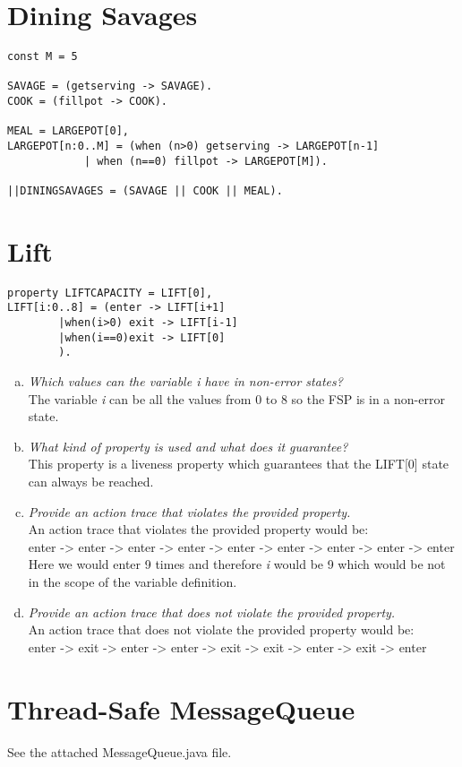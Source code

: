 \documentclass{report}
\begin{document}
	\section{Dining Savages}
	\startsection
		\begin{verbatim}
const M = 5

SAVAGE = (getserving -> SAVAGE).
COOK = (fillpot -> COOK).

MEAL = LARGEPOT[0],
LARGEPOT[n:0..M] = (when (n>0) getserving -> LARGEPOT[n-1] 
			| when (n==0) fillpot -> LARGEPOT[M]).

||DININGSAVAGES = (SAVAGE || COOK || MEAL).
		\end{verbatim}
	\closesection	
	
	\newpage	
	
	\section{Lift}
	\startsection
		\begin{verbatim}
property LIFTCAPACITY = LIFT[0],
LIFT[i:0..8] = (enter -> LIFT[i+1]
		|when(i>0) exit -> LIFT[i-1]
		|when(i==0)exit -> LIFT[0]
		).
		\end{verbatim}
		\begin{enumerate}[a)]
			\item \textit{Which values can the variable i have in non-error states?} \\
			The variable \textit{i} can be all the values from 0 to 8 so the FSP is in a non-error state.
			\item \textit{What kind of property is used and what does it guarantee?} \\
			This property is a liveness property which guarantees that the LIFT[0] state can always be reached.
			\item \textit{Provide an action trace that violates the provided property.} \\
			An action trace that violates the provided property would be: \\
			enter -> enter -> enter -> enter -> enter -> enter -> enter -> enter -> enter \\
			Here we would enter 9 times and therefore \textit{i} would be 9 which would be not in the scope of the variable definition.
			\item \textit{Provide an action trace that does not violate the provided property.} \\
			An action trace that does not violate the provided property would be: \\
			enter -> exit -> enter -> enter -> exit -> exit -> enter -> exit -> enter \\
		\end{enumerate}
	\closesection
	
	\section{Thread-Safe MessageQueue}
	\startsection
		See the attached MessageQueue.java file.
	\closesection
\end{document}
